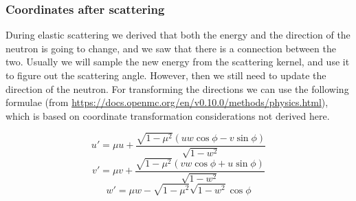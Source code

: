 \subsubsection{Coordinates after scattering}

During elastic scattering we derived that both the energy and the direction of the neutron is going to change, and we saw that there is a connection between the two. Usually we will sample the new energy from the scattering kernel, and use it to figure out the scattering angle. However, then we still need to update the direction of the neutron. For transforming the directions we can use the following formulae (from \url{https://docs.openmc.org/en/v0.10.0/methods/physics.html}), which is based on coordinate transformation considerations not derived here.

\begin{equation}
u' = \mu u + \frac{\sqrt{1 - \mu^2} ( uw \cos\phi - v \sin\phi )}{\sqrt{1 -
w^2}} 
\end{equation}
\begin{equation}
v' = \mu v + \frac{\sqrt{1 - \mu^2} ( vw \cos\phi + u \sin\phi )}{\sqrt{1 -
w^2}} 
\end{equation}
\begin{equation}
w' = \mu w - \sqrt{1 - \mu^2} \sqrt{1 - w^2} \cos\phi
\end{equation}

%